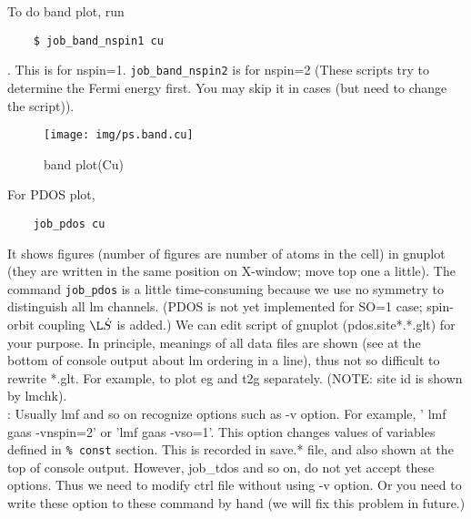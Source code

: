 \documentclass[a4paper,10pt,epsf,fleqn]{article}
\begin{document}
To do band plot, run
\begin{verbatim}
    $ job_band_nspin1 cu
\end{verbatim}
. This is for nspin=1.
\verb+job_band_nspin2+ is for nspin=2
(These scripts try to determine the Fermi energy first. You may skip it
in cases (but need to change the script)).

\begin{figure}[h]
 \begin{center}
  \texttt{[image: img/ps.band.cu]}
  \caption{band plot(Cu)}
 \end{center}
\end{figure}

For PDOS plot,
\begin{verbatim}
    job_pdos cu
\end{verbatim}
It shows figures (number of figures are number of atoms in the cell) in
gnuplot (they are written in the same position on X-window;
move top one a little). The command \verb+job_pdos+ is a little 
time-consuming because we use no symmetry to distinguish all lm channels.
(PDOS is not yet implemented for SO=1 case; spin-orbit coupling $\L\dot S$ is added.)
We can edit script of gnuplot (pdos.site*.*.glt) for your purpose.
In principle, meanings of all data files are shown (see at the bottom
of console output about lm ordering in a line), thus not so difficult to
rewrite *.glt. For example, to plot eg and t2g separately. 
(NOTE: site id is shown by lmchk).\\

: 
Usually lmf and so on recognize options such as -v option. For example,
' lmf gaas -vnspin=2' or 'lmf gaas -vso=1'. 
This option changes values of variables defined in \verb+% const+ section.
This is recorded in save.* file, and also shown at the top of console output. 
However, job\_tdos and so on, do not yet accept these options.
Thus we need to modify ctrl file without using -v option.
Or you need to write these option to these command by hand
(we will fix this problem in future.)


\end{document}
